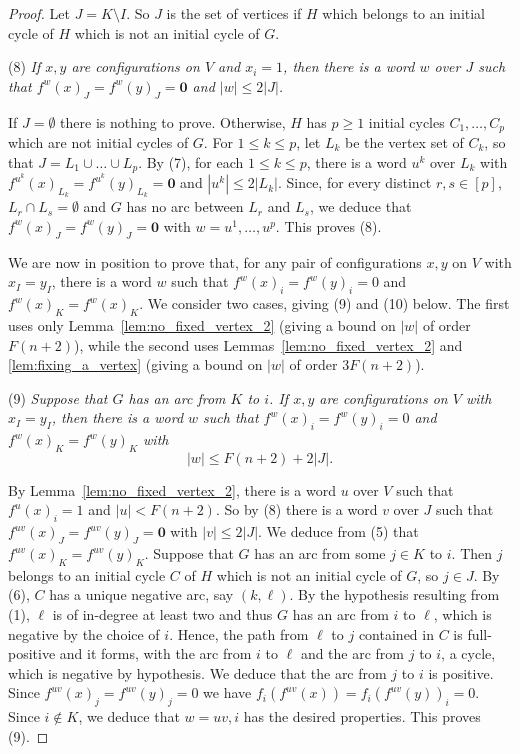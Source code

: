 \documentclass[11pt,letter]{article}
\newcommand{\ZERO}{{\mathbf{0}}}
\begin{document}
\begin{proof}
\bigskip
Let $J=K\setminus I$. So $J$ is the set of vertices if $H$ which belongs to an initial cycle of $H$ which is not an initial cycle of $G$. 

\bigskip
\noindent
(8) {\em If $x,y$ are configurations on $V$ and $x_i=1$, then there is a word $w$ over $J$ such that $f^w(x)_J=f^w(y)_J=\ZERO$ and $|w|\leq 2|J|$.} 

\medskip
\noindent
If $J=\emptyset$ there is nothing to prove. Otherwise, $H$ has $p\geq 1$ initial cycles $C_1,\dots,C_p$ which are not initial cycles of $G$. For $1\leq k\leq p$, let $L_k$ be the vertex set of $C_k$, so that $J=L_1\cup\dots \cup L_p$. By (7), for each $1\leq k\leq p$, there is a word $u^k$ over $L_k$ with $f^{u^k}(x)_{L_k}=f^{u^k}(y)_{L_k}=\ZERO$ and $|u^k|\leq 2|L_k|$. Since, for every distinct $r,s\in [p]$, $L_r\cap L_s=\emptyset$ and $G$ has no arc between $L_r$ and $L_s$, we deduce that $f^w(x)_J=f^w(y)_J=\ZERO$ with $w=u^1,\dots,u^p$. This proves (8).

\bigskip
We are now in position to prove that, for any pair of configurations $x,y$ on $V$ with $x_I=y_I$, there is a word $w$ such that $f^w(x)_i=f^w(y)_i=0$ and $f^w(x)_K=f^w(x)_K$. We consider two cases, giving (9) and (10) below. The first uses only Lemma~\ref{lem:no_fixed_vertex_2} (giving a bound on $|w|$ of order $F(n+2)$), while the second uses  Lemmas~\ref{lem:no_fixed_vertex_2} and \ref{lem:fixing_a_vertex} (giving a bound on $|w|$ of order $3F(n+2)$). 

\bigskip
\noindent
(9) {\em Suppose that $G$ has an arc from $K$ to $i$. If $x,y$ are configurations on $V$ with $x_I=y_I$, then there is a word $w$ such that $f^w(x)_i=f^w(y)_i=0$ and $f^w(x)_K=f^w(y)_K$ with}
\[
|w|\leq F(n+2)+2|J|.
\]

\medskip
\noindent
By Lemma~\ref{lem:no_fixed_vertex_2}, there is a word $u$ over $V$ such that $f^u(x)_i=1$ and $|u|< F(n+2)$. So by (8) there is a word $v$ over $J$ such that $f^{uv}(x)_J=f^{uv}(y)_J=\ZERO$ with $|v|\leq 2|J|$. We deduce from (5) that $f^{uv}(x)_K=f^{uv}(y)_K$. Suppose that $G$ has an arc from some $j\in K$ to $i$. Then $j$ belongs to an initial cycle $C$ of $H$ which is not an initial cycle of $G$, so $j\in J$. By (6), $C$ has a unique negative arc, say $(k,\ell)$. By the hypothesis resulting from (1), $\ell$ is of in-degree at least two and thus $G$ has an arc from $i$ to $\ell$, which is negative by the choice of $i$. Hence, the path from $\ell$ to $j$ contained in $C$ is full-positive and it forms, with the arc from $i$ to $\ell$ and the arc from $j$ to $i$, a cycle, which is negative by hypothesis. We deduce that the arc from $j$ to $i$ is positive. Since $f^{uv}(x)_j=f^{uv}(y)_j=0$ we have $f_i(f^{uv}(x))=f_i(f^{uv}(y))_i=0$. Since $i\not\in K$, we deduce that $w=uv,i$ has the desired properties. This proves (9). 


\end{proof}
\end{document}
